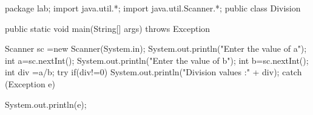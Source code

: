 package lab;
import java.util.*;
import java.util.Scanner.*;
public class Division {
	public static void main(String[] args) throws Exception{
Scanner sc =new Scanner(System.in);
 System.out.println("Enter the value of a");
 int a=sc.nextInt();
 System.out.println("Enter the value of b");
 int b=sc.nextInt();
 int div =a/b;
 try{
	 if(div!=0){
		 System.out.println("Division values :" + div);}
	 }
		 catch (Exception e){
			 System.out.println(e);
			 
		 
	 }
 
	}}
	 